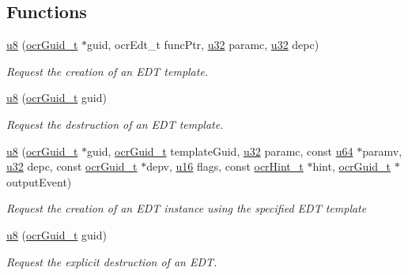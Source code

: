 \subsection*{Functions}
\begin{DoxyCompactItemize}
\item
  \hyperlink{type_u8}{u8} \hyperlink{func_ocrEdtTemplateCreate}
            {}(\hyperlink{type_ocrGuid_t}{ocr\-Guid\-\_\-t} $\ast$guid,
    ocrEdt\_t funcPtr, \hyperlink{type_u32}{u32} paramc, \hyperlink{type_u32}{u32} depc)
    \begin{DoxyCompactList}
      \small\item \emph{Request the creation of an EDT template.}
    \end{DoxyCompactList}
\item
  \hyperlink{type_u8}{u8} \hyperlink{func_ocrEdtTemplateDestroy}
            {}(\hyperlink{type_ocrGuid_t}{ocr\-Guid\-\_\-t} guid)
  \begin{DoxyCompactList}
    \small\item \emph{Request the destruction of an EDT template.}
  \end{DoxyCompactList}
\item
  \hyperlink{type_u8}{u8} \hyperlink{func_ocrEdtCreate}
            {}(\hyperlink{type_ocrGuid_t}{ocr\-Guid\-\_\-t} $\ast$guid,
    \hyperlink{type_ocrGuid_t}{ocr\-Guid\-\_\-t} template\-Guid,
    \hyperlink{type_u32}{u32} paramc, const \hyperlink{type_u64}{u64} $\ast$paramv,
    \hyperlink{type_u32}{u32} depc, const \hyperlink{type_ocrGuid_t}{ocr\-Guid\-\_\-t} $\ast$depv,
    \hyperlink{type_u16}{u16} flags, const \hyperlink{type_ocrHint_t}{ocr\-Hint\-\_\-t} $\ast$hint,
    \hyperlink{type_ocrGuid_t}{ocr\-Guid\-\_\-t} $\ast$output\-Event)
    \begin{DoxyCompactList}
      \small\item \emph{Request the creation of an EDT instance using
        the specified EDT template}
    \end{DoxyCompactList}
\item
  \hyperlink{type_u8}{u8} \hyperlink{func_ocrEdtDestroy}
            {}(\hyperlink{type_ocrGuid_t}{ocr\-Guid\-\_\-t} guid)
    \begin{DoxyCompactList}
      \small\item \emph{Request the explicit destruction of an EDT.}
    \end{DoxyCompactList}
\end{DoxyCompactItemize}
